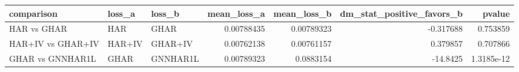 \begin{tabular}{lllrrrr}
\toprule
comparison & loss_a & loss_b & mean_loss_a & mean_loss_b & dm_stat_positive_favors_b & pvalue \\
\midrule
HAR vs GHAR & HAR & GHAR & 0.00788435 & 0.00789323 & -0.317688 & 0.753859 \\
HAR+IV vs GHAR+IV & HAR+IV & GHAR+IV & 0.00762138 & 0.00761157 & 0.379857 & 0.707866 \\
GHAR vs GNNHAR1L & GHAR & GNNHAR1L & 0.00789323 & 0.0883154 & -14.8425 & 1.3185e-12 \\
\bottomrule
\end{tabular}
